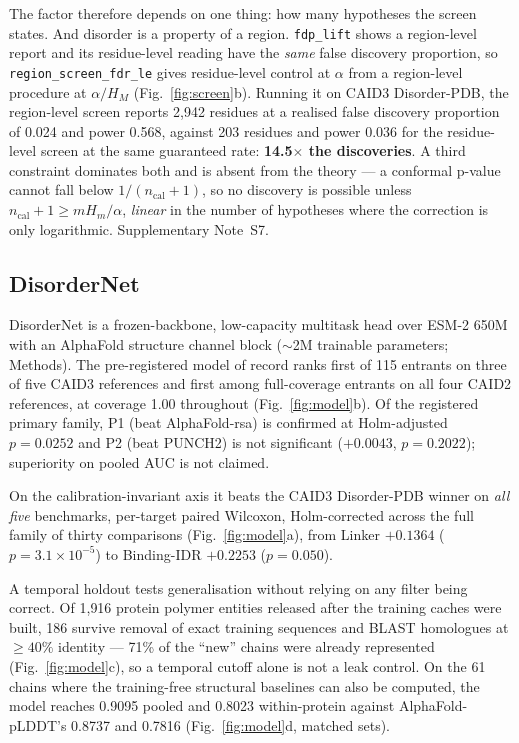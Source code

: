 \documentclass[11pt,a4paper]{article}
\newcommand{\code}[1]{\texttt{\small #1}}
\begin{document}
The factor therefore depends on one thing: how many hypotheses the screen states.
And disorder is a property of a region. \code{fdp\_lift} shows a region-level
report and its residue-level reading have the \emph{same} false discovery
proportion, so \code{region\_screen\_fdr\_le} gives residue-level control at
$\alpha$ from a region-level procedure at $\alpha/H_M$ (Fig.~\ref{fig:screen}b).
Running it on CAID3 Disorder-PDB, the region-level screen reports 2{,}942
residues at a realised false discovery proportion of 0.024 and power 0.568,
against 203 residues and power 0.036 for the residue-level screen at the same
guaranteed rate: \textbf{14.5$\times$ the discoveries}. A third constraint
dominates both and is absent from the theory --- a conformal p-value cannot fall
below $1/(n_{\text{cal}}{+}1)$, so no discovery is possible unless
$n_{\text{cal}} + 1 \ge m H_m/\alpha$, \emph{linear} in the number of hypotheses
where the correction is only logarithmic. Supplementary Note~S7.

\subsection*{DisorderNet}

DisorderNet is a frozen-backbone, low-capacity multitask head over
ESM-2 650M\cite{esm2} with an AlphaFold\cite{af2} structure channel block
($\sim$2M trainable parameters; Methods). The pre-registered model of record
ranks first of 115 entrants on three of five CAID3 references and first among
full-coverage entrants on all four CAID2 references, at coverage 1.00 throughout
(Fig.~\ref{fig:model}b). Of the registered primary family, P1 (beat
AlphaFold-rsa) is confirmed at Holm-adjusted $p = 0.0252$ and P2 (beat PUNCH2)
is not significant ($+0.0043$, $p = 0.2022$); superiority on pooled AUC is not
claimed.

On the calibration-invariant axis it beats the CAID3 Disorder-PDB winner on
\emph{all five} benchmarks, per-target paired Wilcoxon, Holm-corrected across
the full family of thirty comparisons (Fig.~\ref{fig:model}a), from Linker
$+0.1364$ ($p = 3.1\times10^{-5}$) to Binding-IDR $+0.2253$ ($p = 0.050$).

A temporal holdout tests generalisation without relying on any filter being
correct. Of 1{,}916 protein polymer entities released after the training caches
were built, 186 survive removal of exact training sequences and BLAST homologues
at $\ge 40\%$ identity --- 71\% of the ``new'' chains were already represented
(Fig.~\ref{fig:model}c), so a temporal cutoff alone is not a leak control. On
the 61 chains where the training-free structural baselines can also be computed,
the model reaches 0.9095 pooled and 0.8023 within-protein against
AlphaFold-pLDDT's 0.8737 and 0.7816 (Fig.~\ref{fig:model}d, matched sets).
\end{document}
